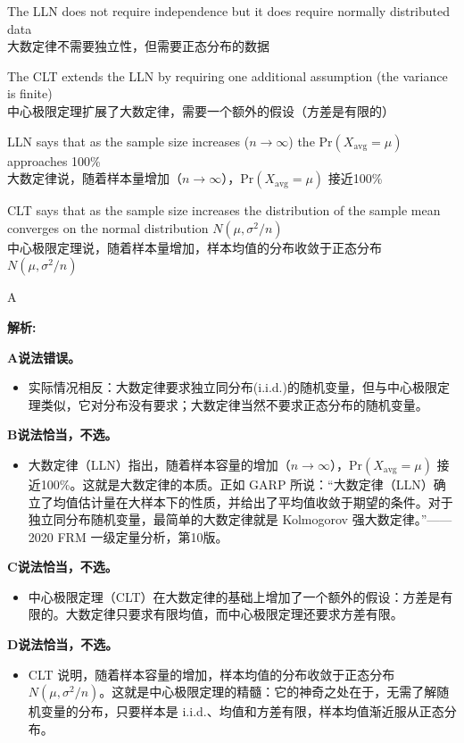 \documentclass{article}
\newenvironment{explanation}
{\textbf{解析:}\par}
{\par}
\begin{document}
\begin{choices}
    \item The LLN does not require independence but it does require normally distributed data
    \\大数定律不需要独立性，但需要正态分布的数据
    \item The CLT extends the LLN by requiring one additional assumption (the variance is finite)
    \\中心极限定理扩展了大数定律，需要一个额外的假设（方差是有限的）
    \item LLN says that as the sample size increases ($n \to \infty$) the $\text{Pr}(X_{\text{avg}} = \mu)$ approaches 100\%
    \\大数定律说，随着样本量增加（$n \to \infty$），$\text{Pr}(X_{\text{avg}} = \mu)$ 接近100\%
    \item CLT says that as the sample size increases the distribution of the sample mean converges on the normal distribution $N(\mu, \sigma^2/n)$
    \\中心极限定理说，随着样本量增加，样本均值的分布收敛于正态分布 $N(\mu, \sigma^2/n)$
\end{choices}

\begin{correctanswer}
    A
\end{correctanswer}

\begin{explanation}
    \textbf{A说法错误。}
    \begin{itemize}
        \item 实际情况相反：大数定律要求独立同分布(i.i.d.)的随机变量，但与中心极限定理类似，它对分布没有要求；大数定律当然不要求正态分布的随机变量。
    \end{itemize}

    \textbf{B说法恰当，不选。}
    \begin{itemize}
        \item 大数定律（LLN）指出，随着样本容量的增加（$n \to \infty$），$\text{Pr}(X_{\text{avg}} = \mu)$ 接近100\%。这就是大数定律的本质。正如 GARP 所说：“大数定律（LLN）确立了均值估计量在大样本下的性质，并给出了平均值收敛于期望的条件。对于独立同分布随机变量，最简单的大数定律就是 Kolmogorov 强大数定律。”——2020 FRM 一级定量分析，第10版。
    \end{itemize}
    
    \textbf{C说法恰当，不选。}
    \begin{itemize}
        \item 中心极限定理（CLT）在大数定律的基础上增加了一个额外的假设：方差是有限的。大数定律只要求有限均值，而中心极限定理还要求方差有限。
    \end{itemize}
    
    \textbf{D说法恰当，不选。}
    \begin{itemize}
        \item CLT 说明，随着样本容量的增加，样本均值的分布收敛于正态分布 $N(\mu, \sigma^2/n)$。这就是中心极限定理的精髓：它的神奇之处在于，无需了解随机变量的分布，只要样本是 i.i.d.、均值和方差有限，样本均值渐近服从正态分布。
    \end{itemize}
\end{explanation}
\end{document}
